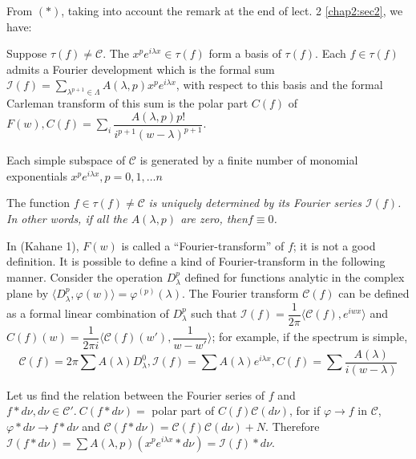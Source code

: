 From $(*)$, taking into account the remark at the end of lect. 2
\ref{chap2:sec2}, we have:
\begin{theorem*}%
 Suppose $\tau(f) \neq \mathscr{C}$. The $x^p e^{i \lambda x}\in
 \tau(f)$ form a basis of $\tau(f)$. Each $f \in
 \tau(f)$ admits a Fourier development which is the formal sum
 $\mathscr{I} (f) = \sum\limits_{\lambda^{p+1} \in \Lambda} A(\lambda, p)
 x^p e^{i \lambda x}$, with respect to this basis and the formal
 Carleman transform of this sum is the polar part $C (f)$ of $F(w),
 C(f) = \sum_i \dfrac{A(\lambda, p) p!}{i^{p+1}(w-\lambda)^{p+1}}$. 
\end{theorem*}

\begin{coro*}%
 Each simple subspace of $\mathscr{C}$ is generated by a finite
 number of monomial exponentials $x^pe^{i \lambda x}, p=0, 1, \ldots
 n$ 
\end{coro*}

\begin{remark*}%
  The function $f \in \tau(f)\neq \mathscr{C}$ \em{is uniquely
    determined by its Fourier series} $\mathscr{I}(f)$. In other
  words, if all the $A(\lambda, p)$ are zero, then\pageoriginale $f \equiv
  0$. 
\end{remark*}

In (Kahane 1), $F(w)$ is called a ``Fourier-transform'' of $f$; it
is not a good definition. It is possible to define a kind of
Fourier-transform in the following manner. Consider the operation
$D_{\lambda}^p$ defined for functions analytic in the complex plane by
$\langle D_{\lambda}^p, \varphi (w) \rangle
=\varphi^{(p)}(\lambda)$. The Fourier transform $\mathscr{C}(f)$ can
be defined as a formal linear combination of $D^p_{\lambda}$ such that
$\mathscr{I}(f) = \dfrac{1}{2 \pi} \langle \mathscr{C}(f), e^{i w x}
\rangle$ and $C(f)(w) = \dfrac{1}{2 \pi i} \langle
\mathscr{C}(f)(w'), \dfrac{1}{w-w'} \rangle$; for example, if the
spectrum is simple, 
$$
\mathscr{C}(f) = 2 \pi \sum A(\lambda)D^0_{\lambda},
\mathscr{I}(f)=\sum A(\lambda)e^{i \lambda x}, C(f) = \sum
\frac{A(\lambda)}{i (w-\lambda)} 
$$

Let us find the relation between the Fourier series of $f$ and $f * d
\nu, d \nu \in \mathscr{C}'. ~C(f *d \nu) = $ polar part of $C(f)
\mathscr{C}(d \nu)$, for if $\varphi \to f$ in $\mathscr{C}$, $\varphi
*d \nu \to f * d \nu$ and $\mathscr{C}(f*d \nu ) =
\mathscr{C}(f)\mathscr{C}(d \nu) + N$. Therefore $\mathscr{I}(f * d
\nu) = \sum A (\lambda, p)(x^p e^{ i \lambda x}* d
\nu)=\mathscr{I}(f)*d \nu$. 

